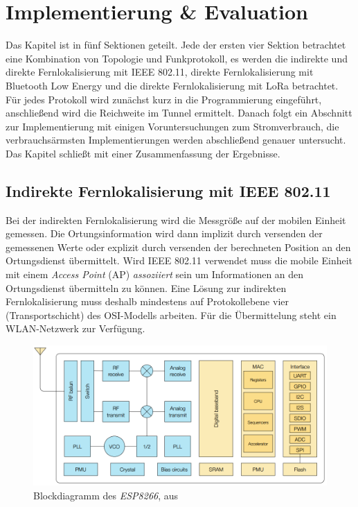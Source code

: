 \chapter{Implementierung \& Evaluation}
\label{ch:Implementierung}
Das Kapitel ist in fünf Sektionen geteilt. 
Jede der ersten vier Sektion betrachtet eine Kombination von Topologie und Funkprotokoll, es werden die indirekte und direkte Fernlokalisierung mit IEEE 802.11, direkte Fernlokalisierung mit Bluetooth Low Energy und die direkte Fernlokalisierung mit LoRa betrachtet.
Für jedes Protokoll wird zunächst kurz in die Programmierung eingeführt, anschließend wird die Reichweite im Tunnel ermittelt.
Danach folgt ein Abschnitt zur Implementierung mit einigen Voruntersuchungen zum Stromverbrauch, die verbrauchsärmsten Implementierungen werden abschließend genauer untersucht.
Das Kapitel schließt mit einer Zusammenfassung der Ergebnisse.

\section{Indirekte Fernlokalisierung mit IEEE 802.11}
\label{ch:phase1}
Bei der indirekten Fernlokalisierung wird die Messgröße auf der mobilen Einheit gemessen.
Die Ortungsinformation wird dann implizit durch versenden der gemessenen Werte oder explizit durch versenden der berechneten Position an den Ortungsdienst übermittelt.
Wird IEEE 802.11 verwendet muss die mobile Einheit mit einem \emph{Access Point} (AP) \emph{assoziiert} sein um Informationen an den Ortungsdienst übermitteln zu können.
Eine Lösung zur indirekten Fernlokalisierung muss deshalb mindestens auf Protokollebene vier (Transportschicht) des OSI-Modells arbeiten.
Für die Übermittelung steht ein WLAN-Netzwerk zur Verfügung.

\begin{figure}[h]
  \centering
	\includegraphics[width=\textwidth]{images/espblock.png}
  \caption{Blockdiagramm des \emph{ESP8266}, aus \cite{espressif2017esp8266}}
  \label{fig:espblock}
\end{figure}

